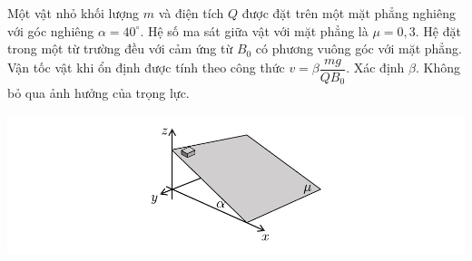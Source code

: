  \begin{vd}
     Một vật nhỏ khối lượng $m$ và điện tích $Q$ được đặt trên một mặt phẳng nghiêng với góc nghiêng $\alpha=40^\circ$. Hệ số ma sát giữa vật với mặt phẳng là $\mu=0,3$. Hệ đặt trong một từ trường đều với cảm ứng từ $B_0$ có phương vuông góc với mặt phẳng. Vận tốc vật khi ổn định được tính theo công thức $v=\beta\dfrac{mg}{QB_0}$. Xác định $\beta$. Không bỏ qua ảnh hưởng của trọng lực.
    \begin{center}
        \includegraphics[width=\textwidth]{Anh/04.pdf}
    \end{center}
\end{vd}
